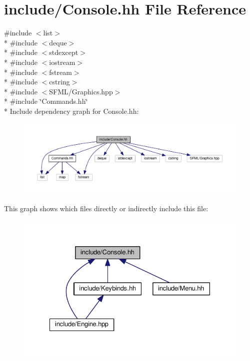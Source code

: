 \hypertarget{Console_8hh}{}\section{include/\+Console.hh File Reference}
\label{Console_8hh}
{\ttfamily \#include $<$list$>$}\\*
{\ttfamily \#include $<$deque$>$}\\*
{\ttfamily \#include $<$stdexcept$>$}\\*
{\ttfamily \#include $<$iostream$>$}\\*
{\ttfamily \#include $<$fstream$>$}\\*
{\ttfamily \#include $<$cstring$>$}\\*
{\ttfamily \#include $<$S\+F\+M\+L/\+Graphics.\+hpp$>$}\\*
{\ttfamily \#include \char`\"{}Commands.\+hh\char`\"{}}\\*
Include dependency graph for Console.\+hh\+:\nopagebreak
\begin{figure}[H]
\begin{center}
\leavevmode
\includegraphics[width=350pt]{Console_8hh__incl}
\end{center}
\end{figure}
This graph shows which files directly or indirectly include this file\+:\nopagebreak
\begin{figure}[H]
\begin{center}
\leavevmode
\includegraphics[width=328pt]{Console_8hh__dep__incl}
\end{center}
\end{figure}
